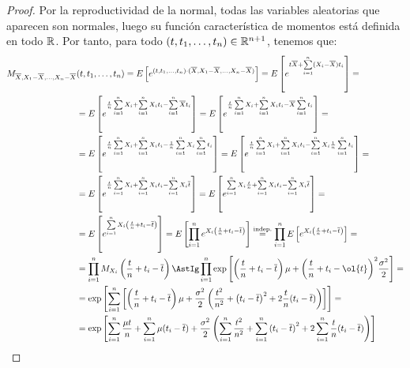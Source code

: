 \begin{prop}
\begin{proof}
        Por la reproductividad de la normal, todas las variables aleatorias que aparecen son normales, luego su función característica de momentos está definida en todo $\mathbb{R}$. Por tanto, para todo $(t, t_1, \ldots, t_n)\in \mathbb{R}^{n+1}$, tenemos que:
        \begin{align*}
            M_{\overline{X},X_1 - \overline{X}, \ldots, X_n - \overline{X}}&(t, t_1, \ldots, t_n) 
            = E\left[e^{(t, t_1, \ldots, t_n) \cdot (\overline{X},X_1 - \overline{X}, \ldots, X_n - \overline{X})}\right]
            = E\left[e^{t\overline{X} + \sum\limits_{i=1}^{n}(X_i - \overline{X})t_i}\right] 
            =\\&= E\left[e^{\frac{t}{n}\sum\limits_{i=1}^n X_i + \sum\limits_{i=1}^n X_it_i - \sum\limits_{i=1}^n \overline{X}t_i}\right] 
            = E\left[e^{\frac{t}{n}\sum\limits_{i=1}^n X_i + \sum\limits_{i=1}^n X_it_i - \overline{X}\sum\limits_{i=1}^n t_i}\right] 
            =\\&= E\left[e^{\frac{t}{n}\sum\limits_{i=1}^n X_i + \sum\limits_{i=1}^n X_it_i - \frac{1}{n}\sum\limits_{i=1}^n X_i\sum\limits_{i=1}^n t_i}\right] 
            = E\left[e^{\frac{t}{n}\sum\limits_{i=1}^n X_i + \sum\limits_{i=1}^n X_it_i - \sum\limits_{i=1}^n X_i\frac{1}{n}\sum\limits_{i=1}^n t_i}\right] 
            =\\&= E\left[e^{\frac{t}{n}\sum\limits_{i=1}^n X_i + \sum\limits_{i=1}^n X_it_i - \sum\limits_{i=1}^n X_i\overline{t}}\right] 
            = E\left[e^{\sum\limits_{i=1}^n X_i\frac{t}{n} + \sum\limits_{i=1}^n X_it_i - \sum\limits_{i=1}^n X_i\overline{t}}\right] 
            =\\&= E\left[e^{\sum\limits_{i=1}^n X_i \left(\frac{t}{n} + t_i - \overline{t}\right)}\right] 
            = E\left[\prod_{i=1}^{n}e^{X_i\left(\frac{t}{n}+t_i - \overline{t}\right)}\right] 
            \stackrel{\text{indep.}}{=} \prod_{i=1}^{n} E\left[e^{X_i\left(\frac{t}{n}+t_i - \overline{t}\right)}\right]
            =\\&= \prod_{i=1}^{n} M_{X_i}\left(\frac{t}{n}+t_i - \overline{t}\right) 
            \AstIg \prod_{i=1}^{n} \exp\left[\left(\frac{t}{n}+t_i-\overline{t}\right)\mu + {\left(\frac{t}{n}+t_i - \ol{t}\right)}^{2}\frac{\sigma^2}{2}\right]
            =\\&=\exp\left[\sum\limits_{i=1}^n \left[\left(\frac{t}{n}+t_i - \overline{t}\right)\mu + \frac{\sigma^2}{2} \left(\frac{t^2}{n^2} + {\left(t_i - \overline{t}\right)}^{2} + 2\frac{t}{n}(t_i - \overline{t})\right)\right]\right] 
            =\\&= \exp\left[\sum\limits_{i=1}^n \frac{\mu t}{n} + \sum\limits_{i=1}^n \mu (t_i-\overline{t}) + \frac{\sigma^2}{2}\left(\sum\limits_{i=1}^n \frac{t^2}{n^2} + \sum\limits_{i=1}^n {(t_i - \overline{t})}^{2} + 2\sum\limits_{i=1}^n \frac{t}{n}(t_i - \overline{t}) \right)\right]

\end{align*}
\end{proof}
\end{prop}
